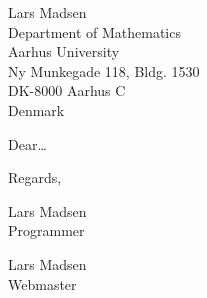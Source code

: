 \documentclass[%
 english,              %
 unit=math,            %
]{aultrdesign}
\begin{document}
\begin{ColophonData}
\end{ColophonData}
\begin{ReceiverAddress}
  Lars Madsen\\
  Department of Mathematics\\
  Aarhus University\\
  Ny Munkegade 118, Bldg. 1530\\
  DK-8000 Aarhus C\\
  Denmark
\end{ReceiverAddress}

\begin{Letter}
\opening{Dear\dots}

\kant[1] %


\begin{Closing}{Regards,}
  \begin{primarysignature}[gfxsignature={\texttt{[image: daleif]}}]
    Lars Madsen\\Programmer
  \end{primarysignature}
  \begin{secondarysignature}[gfxsignature={\texttt{[image: daleif]}}]
    Lars Madsen\\Webmaster
  \end{secondarysignature}
\end{Closing}
\end{Letter}
\end{document}
